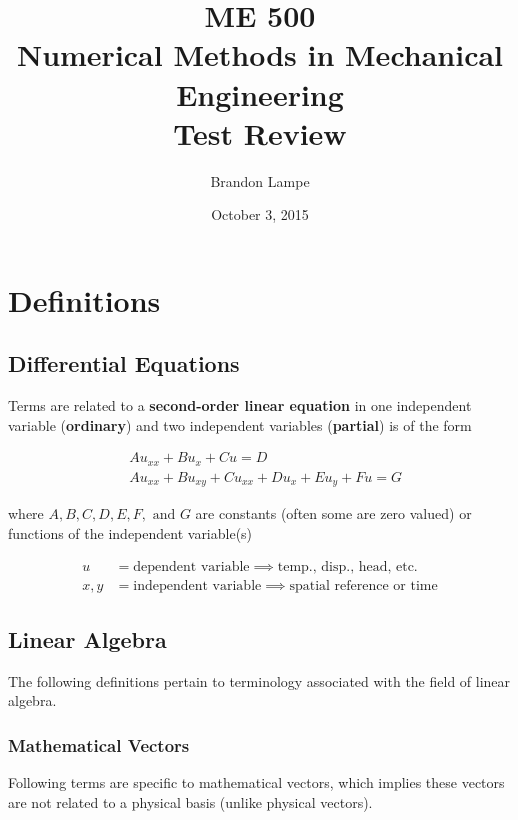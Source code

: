 \documentclass[letterpaper,reqno,oneside]{amsart}
\title{ME 500\\ Numerical Methods in Mechanical Engineering\\ Test Review}
\author{Brandon Lampe}
\date{October 3, 2015} %
\begin{document}
\maketitle
\section{Definitions}
\subsection{Differential Equations\\}
Terms are related to a \textbf{second-order linear equation} in one independent variable (\textbf{ordinary}) and two independent variables (\textbf{partial}) is of the form

\begin{align}
& Au_{xx} + Bu_x + Cu = D \\
& Au_{xx} + Bu_{xy} + Cu_{xx} + Du_x +Eu_y + Fu = G
\end{align}

where $A,B,C,D,E,F, \text{ and } G$ are constants (often some are zero valued) or functions of the independent variable(s)

\begin{align*}
	u &= \text{dependent variable} \implies \text{temp., disp., head, etc.}\\
	x,y &= \text{independent variable} \implies \text{spatial reference or time}
\end{align*}

\subsection{Linear Algebra\\}
The following definitions pertain to terminology associated with the field of linear algebra.\\
\subsubsection{Mathematical Vectors\\}
Following terms are specific to mathematical vectors, which implies these vectors are not related to a physical basis (unlike physical vectors).\\
\end{document}
